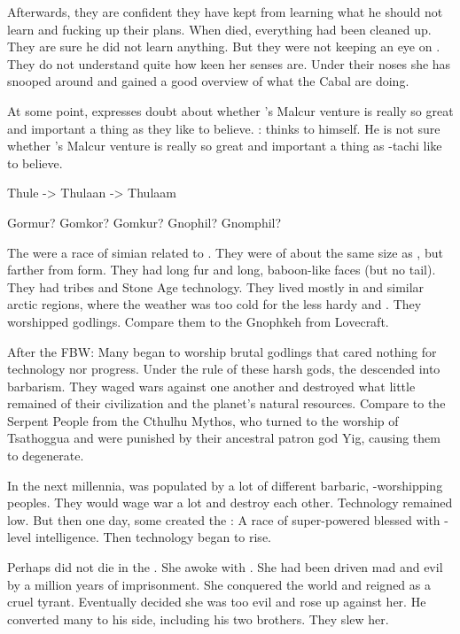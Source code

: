   Afterwards, they are confident they have kept \Ishnaruchaefir from learning what he should not learn and fucking up their plans. 
  When \Teshrial died, everything had been cleaned up.
  They are sure he did not learn anything.
  But they were not keeping an eye on \Criseis.
  They do not understand quite how keen her senses are.
  Under their noses she has snooped around and gained a good overview of what the Cabal are doing. 

At some point, \Menessiaraid expresses doubt about whether \Teshrial's Malcur venture is really so great and important a thing as they like to believe. 
\Azraid:
  \Azraid thinks to himself. 
  He is not sure whether \Teshrial's Malcur venture is really so great and important a thing as \Teshrial-tachi like to believe. 


Thule -> Thulaan -> Thulaam


Gormur? Gomkor? Gomkur? Gnophil? Gnomphil?

The \gnomphilim were a race of simian \humanoids related to \nephilim.
They were of about the same size as \nephilim, but farther from \human form.
They had long fur and long, baboon-like faces (but no tail).
They had tribes and Stone Age technology.
They lived mostly in \Thulaan and similar arctic regions, where the weather was too cold for the less hardy \humans and \scathae.
They worshipped \xss godlings. 
Compare them to the Gnophkeh from Lovecraft. 



After the FBW:
Many \ophidians began to worship brutal \xs godlings that cared nothing for technology nor progress. 
Under the rule of these harsh gods, the \ophidians descended into barbarism.
They waged wars against one another and destroyed what little remained of their civilization and the planet's natural resources.
Compare to the Serpent People from the Cthulhu Mythos, who turned to the worship of Tsathoggua and were punished by their ancestral patron god Yig, causing them to degenerate. 

In the next millennia, \Miith was populated by a lot of different barbaric, \xs-worshipping peoples. 
They would wage war a lot and destroy each other.
Technology remained low.
But then one day, some \quiljaaran created the \aryothim: A race of super-powered \nephilim blessed with \quiljaar-level intelligence.
Then technology began to rise. 



Perhaps \Tiamat did not die in the \firstbanewar.
She awoke with \Nexagglachel. 
She had been driven mad and evil by a million years of imprisonment.
She conquered the world and reigned as a cruel tyrant.
Eventually \Nexagglachel decided she was too evil and rose up against her.
He converted many \dragons to his side, including his two brothers. 
They slew her. 



